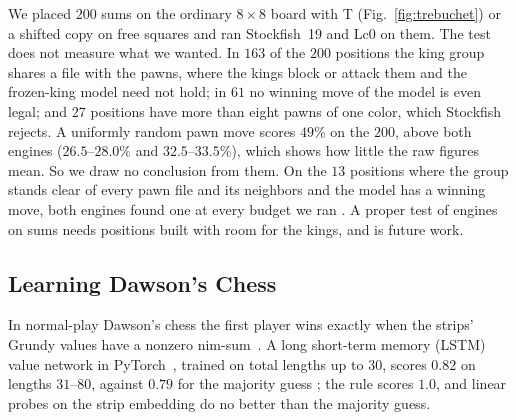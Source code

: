 We placed $200$ sums on the ordinary $8\times8$ board with T (Fig.~\ref{fig:trebuchet}) or a shifted copy on free
squares and ran Stockfish~19 and Lc0 on them. The test does not measure what we wanted. In $163$ of the $200$
positions the king group shares a file with the pawns, where the kings block or attack them and the frozen-king
model need not hold; in $61$ no winning move of the model is even legal; and $27$ positions have more than eight
pawns of one color, which Stockfish rejects. A uniformly random pawn move scores $49\%$ on the $200$, above both engines
($26.5$--$28.0\%$ and $32.5$--$33.5\%$), which shows how little the raw figures mean. So we draw no conclusion
from them. On the $13$ positions where the group stands clear of every pawn file and its neighbors and the model has a winning
move, both engines found one at every budget we ran . A proper test of engines on
sums needs positions built with room for the kings, and is future work.

\subsection{Learning Dawson's Chess}

In normal-play Dawson's chess the first player wins exactly when the strips' Grundy values have a nonzero
nim-sum~\cite{GuySmith1956,WinningWays}. A long short-term memory (LSTM) value network in PyTorch~\cite{PyTorch}, trained on total lengths up to
$30$, scores $0.82$ on lengths $31$--$80$, against $0.79$ for the majority guess ; the rule scores $1.0$,
and linear probes on the strip embedding do no better than the majority guess.
